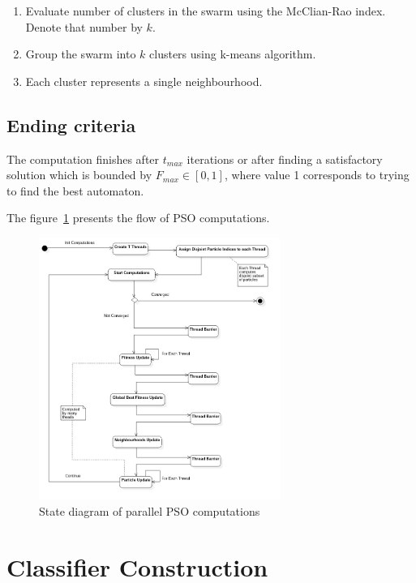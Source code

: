 \documentclass{mini}
\begin{document}
\begin{enumerate}
    \item Evaluate number of clusters in the swarm using the McClian-Rao index. Denote that number by $k$.
    \item Group the swarm into $k$ clusters using k-means algorithm.
    \item Each cluster represents a single neighbourhood.
\end{enumerate}


\section{Ending criteria}
The computation finishes after $t_{max}$ iterations or after finding a satisfactory solution which is bounded by $F_{max} \in [0,1]$, where value 1 corresponds to trying to find the best automaton.

The figure~\ref{fig:pso_state} presents the flow of PSO computations.
\begin{figure}
    \includegraphics[width=0.7\textwidth]{./images/pso_state.jpg}
    \caption{State diagram of parallel PSO computations}
    \label{fig:pso_state}
\end{figure}


\chapter{Classifier Construction}\label{chap:classification}
\end{document}
